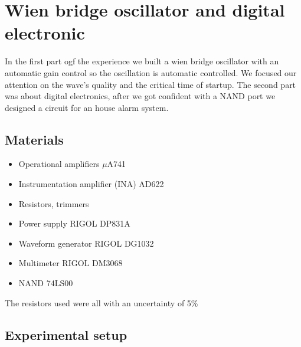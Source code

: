 \chapter{Wien bridge oscillator and digital electronic}
In the first part ogf the experience we built a wien bridge oscillator with an automatic gain control so the oscillation is automatic controlled. We focused our attention on the wave's quality and the critical time of startup. The second part was about digital electronics, after we got confident with a NAND port we designed a circuit for an house alarm system.
\section{Materials}
\begin{itemize}
\item Operational amplifiers $\mu$A741
\item Instrumentation amplifier (INA) AD622
\item Resistors, trimmers
\item Power supply RIGOL DP831A
\item Waveform generator RIGOL DG1032
\item Multimeter RIGOL DM3068
\item NAND 74LS00
\end{itemize}
The resistors used were all with an uncertainty of 5\%
\section{Experimental setup}
